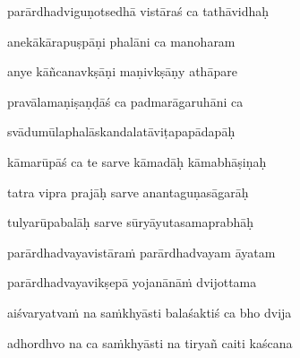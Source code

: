 parārdhadviguṇotsedhā vistāraś ca tathāvidhaḥ\thinspace{\dandab} \dontdisplaylinenum

anekākārapuṣpāṇi phalāni ca manoharam \veg\dontdisplaylinenum
{}

anye kāñcanavkṣāṇi maṇivkṣāṇy athāpare\thinspace{\dandab} \dontdisplaylinenum

pravālamaṇiṣaṇḍāś ca padmarāgaruhāni ca \veg\dontdisplaylinenum
{}

svādumūlaphalāskandalatāviṭapapādapāḥ\thinspace{\dandab} \dontdisplaylinenum

kāmarūpāś ca te sarve kāmadāḥ kāmabhāṣiṇaḥ \veg\dontdisplaylinenum
{}

tatra vipra prajāḥ sarve anantaguṇasāgarāḥ\thinspace{\dandab} \dontdisplaylinenum

tulyarūpabalāḥ sarve sūryāyutasamaprabhāḥ \veg\dontdisplaylinenum
{}

parārdhadvayavistāraṁ parārdhadvayam āyatam\thinspace{\dandab} \dontdisplaylinenum

parārdhadvayavikṣepā yojanānāṁ dvijottama \veg\dontdisplaylinenum
{}

aiśvaryatvaṁ na saṁkhyāsti balaśaktiś ca bho dvija\thinspace{\dandab} \dontdisplaylinenum

adhordhvo na ca saṁkhyāsti na tiryañ caiti kaścana \veg\dontdisplaylinenum
{}

